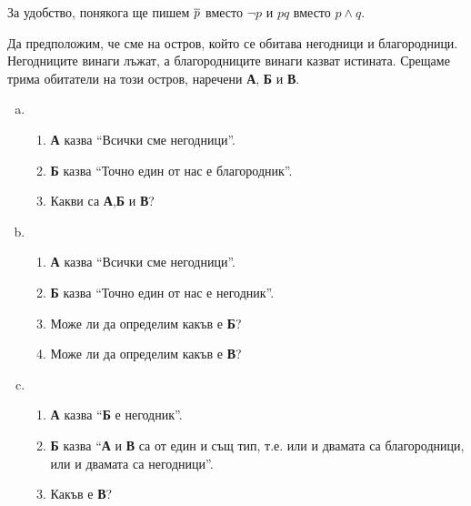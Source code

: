 
  
\begin{remark}
  За удобство, понякога ще пишем $\overline{p}$ вместо $\neg p$ и $pq$ вместо $p \wedge q$.
\end{remark}

\begin{problem}
  Да предположим, че сме на остров, който се обитава негодници и благородници.
  Негодниците винаги лъжат, а благородниците винаги казват истината.
  Срещаме трима обитатели на този остров, наречени {\bf А}, {\bf Б} и {\bf В}.
  \begin{enumerate}[a)]
  \item
    \begin{enumerate}[]
    \item
      {\bf А} казва ``Всички сме негодници''.
    \item
      {\bf Б} казва ``Точно един от нас е благородник''.
    \item
      Какви са {\bf А},{\bf Б} и {\bf В}?
    \end{enumerate}
  \item
    \begin{enumerate}[]
    \item
      {\bf А} казва ``Всички сме негодници''.
    \item
      {\bf Б} казва ``Точно един от нас е негодник''.
    \item
      Може ли да определим какъв е {\bf Б}?
    \item
      Може ли да определим какъв е {\bf В}?
    \end{enumerate}
  \item
    \begin{enumerate}[]
    \item
      {\bf А} казва ``{\bf Б} е негодник''.
    \item
      {\bf Б} казва ``{\bf А} и {\bf В} са от един и същ тип, т.е. или и двамата са благородници, или и двамата са негодници''.
    \item
      Какъв е {\bf В}?
    \end{enumerate}
  \end{enumerate}
\end{problem}
